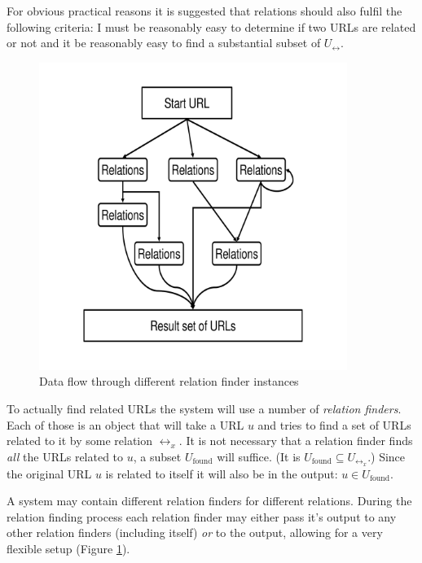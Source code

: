 \documentclass[a4paper]{danarticle}
\begin{document}
       For obvious practical reasons it is suggested that relations should also
       fulfil the following criteria: I must be reasonably easy to determine if
       two URLs are related or not and it be reasonably easy to find a
       substantial subset of $ U_{\leftrightarrow} $. 
       \\
       \begin{figure}[h]
         \centering
	 \includegraphics[width=10cm]{relations}
	 \caption{Data flow through different relation finder instances}
	 \label{relations}
       \end{figure}
       To actually find related URLs the system will use a number of
       \textit{relation finders}. Each of those is an object that will take a
       URL $ u $ and tries to find a set of URLs related to it by some relation
       $ \leftrightarrow_{x} $. It is not necessary that a relation finder
       finds \textit{all} the URLs related to $ u $, a subset 
       $ U_{\mbox{found}} $ will
       suffice. (It is $ U_{\mbox{found}} \subseteq U_{\leftrightarrow_x} $.) 
       Since the original URL $ u $
       is related to itself it will also be in the output: 
       $ u \in U_{\mbox{found}} $.
       
       A system may contain different relation finders for different relations. 
       During the
       relation finding process each relation finder may either pass it's output to
       any other relation finders (including itself) \textit{or} to
       the output, allowing for a very flexible setup (Figure \ref{relations}). 
\end{document}
